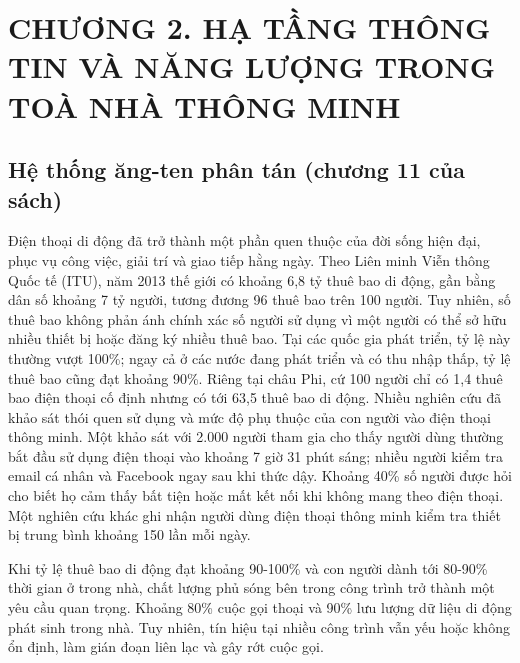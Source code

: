 \documentclass{thesis}
\begin{document}
\newpage

\section*{CHƯƠNG 2. HẠ TẦNG THÔNG TIN VÀ NĂNG LƯỢNG TRONG TOÀ NHÀ THÔNG MINH}
{} %

\setcounter{section}{2}
\setcounter{subsection}{0}
\setcounter{figure}{0}
\setcounter{table}{0}

\subsection{Hệ thống ăng-ten phân tán (chương 11 của sách)}


Điện thoại di động đã trở thành một phần quen thuộc của đời sống hiện
đại, phục vụ công việc, giải trí và giao tiếp hằng ngày. Theo Liên
minh Viễn thông Quốc tế (ITU), năm 2013 thế giới có khoảng 6,8 tỷ
thuê bao di động, gần bằng dân số khoảng 7 tỷ người, tương đương 96
thuê bao trên 100 người. Tuy nhiên, số thuê bao không phản ánh chính
xác số người sử dụng vì một người có thể sở hữu nhiều thiết bị hoặc
đăng ký nhiều thuê bao. Tại các quốc gia phát triển, tỷ lệ này thường
vượt 100\%; ngay cả ở các nước đang phát triển và có thu nhập thấp, tỷ
lệ thuê bao cũng đạt khoảng 90\%. Riêng tại châu Phi, cứ 100 người
chỉ có 1,4 thuê bao điện thoại cố định nhưng có tới 63,5 thuê bao di động.
Nhiều nghiên cứu đã khảo sát thói quen sử dụng và mức độ phụ thuộc
của con người vào điện thoại thông minh. Một khảo sát với 2.000 người
tham gia cho thấy người dùng thường bắt đầu sử dụng điện thoại vào
khoảng 7 giờ 31 phút sáng; nhiều người kiểm tra email cá nhân và
Facebook ngay sau khi thức dậy. Khoảng 40\% số người được hỏi cho biết
họ cảm thấy bất tiện hoặc mất kết nối khi không mang theo điện
thoại. Một nghiên cứu khác ghi nhận người dùng điện thoại thông
minh kiểm tra thiết bị trung bình khoảng 150 lần mỗi ngày.

Khi tỷ lệ thuê bao di động đạt khoảng 90-100\% và con người dành tới
80-90\% thời gian ở trong nhà, chất lượng phủ sóng bên trong công
trình trở thành một yêu cầu quan trọng. Khoảng 80\% cuộc gọi thoại
và 90\% lưu lượng dữ liệu di động phát sinh trong nhà. Tuy nhiên,
tín hiệu tại nhiều công trình vẫn yếu hoặc không ổn định, làm gián
đoạn liên lạc và gây rớt cuộc gọi.
\end{document}

